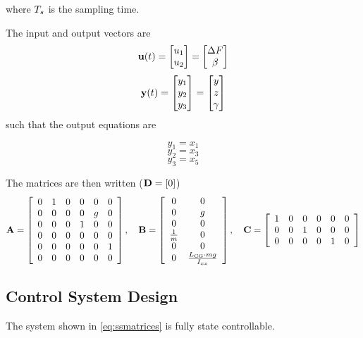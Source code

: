 \documentclass[11pt, titlepage]{article}
\begin{document}
where $T_s$ is the sampling time.

The input and output vectors are 
\[
\mathbf{u}(t) = \begin{bmatrix}
u_1 \\
u_2
\end{bmatrix} = \begin{bmatrix}
\Delta F \\
\beta
\end{bmatrix}
\]
\[
\mathbf{y}(t) = \begin{bmatrix}
y_1 \\
y_2 \\
y_3
\end{bmatrix} = \begin{bmatrix}
y \\
z \\
\gamma
\end{bmatrix}
\]
such that the output equations are

\begin{equation}
	y_1 = x_1 
\end{equation}
\begin{equation}
	y_2 = x_3
\end{equation}
\begin{equation}
	y_3 = x_5
\end{equation}

The matrices are then written ($\mathbf{D} = [0]$)
\begin{equation} \label{eq:ssmatrices}
	\mathbf{A} = 
	\left[\begin{array}{cccccc} 0 & 1 & 0 & 0 & 0 & 0\\ 0 & 0 & 0 & 0 & g & 0\\ 0 & 0 & 0 & 1 & 0 & 0\\ 0 & 0 & 0 & 0 & 0 & 0\\ 0 & 0 & 0 & 0 & 0 & 1\\ 0 & 0 & 0 & 0 & 0 & 0 \end{array}\right],\quad \mathbf{B} = 
	\left[\begin{array}{cc} 0 & 0\\ 0 & g\\ 0 & 0\\ \frac{1}{m} & 0\\ 0 & 0\\ 0 & \frac{L_{\mathrm{CG}} \cdot mg}{I_{xx}} \end{array}\right], \quad \mathbf{C} =  \left[\begin{array}{cccccc} 1 & 0 & 0 & 0 & 0 & 0\\ 0 & 0 & 1 & 0 & 0 & 0\\ 0 & 0 & 0 & 0 & 1 & 0 \end{array}\right]
\end{equation}

\subsection{Control System Design}
The system shown in \eqref{eq:ssmatrices} is fully state controllable.
\end{document}
